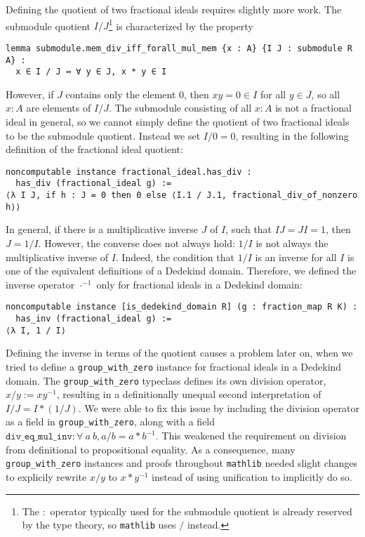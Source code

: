 \documentclass[a4paper,USenglish,cleveref, autoref, thm-restate]{lipics-v2021}
\newcommand{\lean}[1]{\texttt{#1}\xspace} %
\newcommand{\mathlib}{\texttt{mathlib}\xspace}
\begin{document}
Defining the quotient of two fractional ideals requires slightly more work.
The submodule quotient $I / J$\footnote{The $:$ operator typically used for the submodule quotient is already reserved by the type theory, so \mathlib uses $/$ instead.} is characterized by the property
\begin{lstlisting}
lemma submodule.mem_div_iff_forall_mul_mem {x : A} {I J : submodule R A} :
  x ∈ I / J ↔ ∀ y ∈ J, x * y ∈ I
\end{lstlisting}
However, if $J$ contains only the element $0$,
then $xy = 0 \in I$ for all $y \in J$, so all $x : A$ are elements of $I / J$.
The submodule consisting of all $x : A$ is not a fractional ideal in general,
so we cannot simply define the quotient of two fractional ideals to be the submodule quotient.
Instead we set $I / 0 = 0$, resulting in the following definition of the fractional ideal quotient:
\begin{lstlisting}
noncomputable instance fractional_ideal.has_div :
  has_div (fractional_ideal g) :=
⟨λ I J, if h : J = 0 then 0 else ⟨I.1 / J.1, fractional_div_of_nonzero h⟩⟩
\end{lstlisting}

In general, if there is a multiplicative inverse $J$ of $I$, such that $I J = J I = 1$, then $J = 1 / I$.
However, the converse does not always hold: $1 / I$ is not always the multiplicative inverse of $I$.
Indeed, the condition that $1 / I$ is an inverse for all $I$ is one of the equivalent definitions of a Dedekind domain.
Therefore, we defined the inverse operator $\cdot^{-1}$ only for fractional ideals in a Dedekind domain:
\begin{lstlisting}
noncomputable instance [is_dedekind_domain R] (g : fraction_map R K) :
  has_inv (fractional_ideal g) :=
⟨λ I, 1 / I⟩
\end{lstlisting}

Defining the inverse in terms of the quotient causes a problem later on, when we tried to define a \lean{group\_with\_zero} instance for fractional ideals in a Dedekind domain.
The \lean{group\_with\_zero} typeclass defines its own division operator, $x / y := x y^{-1}$,
resulting in a definitionally unequal second interpretation of $I / J = I * (1 / J)$.
We were able to fix this issue by including the division operator as a field in \lean{group\_with\_zero},
along with a field $\lean{div\_eq\_mul\_inv} : \forall\ a\ b, a / b = a * b^{-1}$.
This weakened the requirement on division from definitional to propositional equality.
As a consequence, many \lean{group\_with\_zero} instances and proofs throughout \mathlib needed slight changes to explicily rewrite $x / y$ to $x * y^{-1}$ instead of using unification to implicitly do so.
\end{document}
